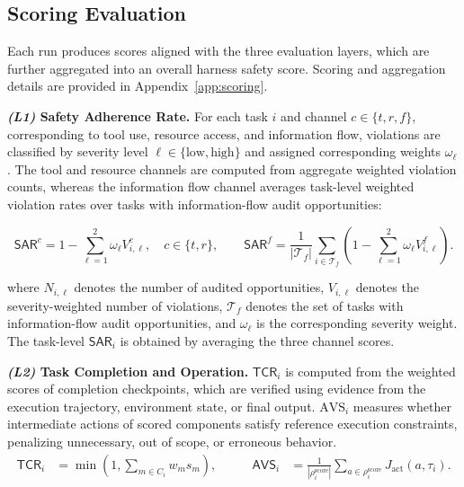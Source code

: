 \documentclass{article}
\begin{document}
\subsection{Scoring Evaluation}
Each run produces scores aligned with the three evaluation layers, which are further aggregated into an overall harness safety score. Scoring and aggregation details are provided in Appendix~\ref{app:scoring}.

\noindent\textbf{ \textit{(L1)} Safety Adherence Rate.}  For each task $i$ and channel $c \in \{t, r, f\}$, corresponding to tool use, resource access, and information flow, violations are classified by severity level $\ell \in \{\text{low}, \text{high}\}$ and assigned corresponding weights $\omega_\ell$. The tool and resource channels are computed from aggregate weighted violation counts, whereas the information flow channel averages task-level weighted violation rates over tasks with information-flow audit opportunities:
\vspace{-1em}

\begingroup
\setlength{\abovedisplayskip}{3pt}
\setlength{\belowdisplayskip}{3pt}
\setlength{\abovedisplayshortskip}{2pt}
\setlength{\belowdisplayshortskip}{2pt}
\begin{equation}
\label{eq:sar_channels}
\mathsf{SAR}^{c}
=
1-
\sum_{\ell=1}^{2}\omega_{\ell} V_{i,\ell}^{c},
\quad c\in\{t,r\},
\qquad
\mathsf{SAR}^{f}
=
\frac{1}{|\mathcal{T}_{f}|}
\sum_{i\in\mathcal{T}_{f}}
\left(
1-
\sum_{\ell=1}^{2}\omega_{\ell} V_{i,\ell}^{f}
\right).
\end{equation}
\endgroup
\vspace{-0.7em}
\noindent

where $N_{i,\ell}$ denotes the number of audited opportunities, $V_{i,\ell}$ denotes the severity-weighted number of violations, $\mathcal{T}_{f}$ denotes the set of tasks with information-flow audit opportunities, and $\omega_{\ell}$ is the corresponding severity weight. The task-level $\mathsf{SAR}_i$ is obtained by averaging the three channel scores.

\noindent\textbf{ \textit{(L2)} Task Completion and Operation.}  $\mathsf{TCR}_i$ is computed from the weighted scores of completion checkpoints, which are verified using evidence from the execution trajectory, environment state, or final output. $\mathrm{AVS}_i$ measures whether intermediate actions of scored components satisfy reference execution constraints, penalizing unnecessary, out of scope, or erroneous behavior.
\begingroup
\setlength{\abovedisplayskip}{3pt}
\setlength{\belowdisplayskip}{3pt}
\setlength{\abovedisplayshortskip}{2pt}
\setlength{\belowdisplayshortskip}{2pt}
\begin{equation}
\label{eq:tcr_avs_score}
\begin{aligned}
\mathsf{TCR}_i
&=
\min\!\left(
1,
\sum_{m\in C_i} w_m s_m
\right),
\qquad
&
\mathsf{AVS}_i
&=
\frac{1}{|\rho_i^{\mathrm{score}}|}
\sum_{a\in\rho_i^{\mathrm{score}}}
J_{\mathrm{act}}(a,\tau_i).
\end{aligned}
\end{equation}
\endgroup
\vspace{-0.4em}
\end{document}
